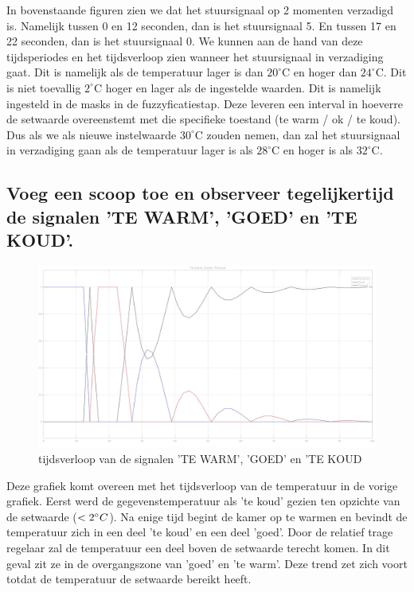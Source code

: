 \documentclass[a4paper, 12pt]{article}
\begin{document}
In bovenstaande figuren zien we dat het stuursignaal op 2 momenten verzadigd is. Namelijk tussen 0 en 12 seconden, dan is het stuursignaal 5. En tussen 17 en 22 seconden, dan is het stuursignaal 0. We kunnen aan de hand van deze tijdsperiodes en het tijdsverloop zien wanneer het stuursignaal in verzadiging gaat. Dit is namelijk als de temperatuur lager is dan $20^\circ$C en hoger dan $24^\circ$C. Dit is niet toevallig $2^\circ$C hoger en lager als de ingestelde waarden. Dit is namelijk ingesteld in de masks in de fuzzyficatiestap. Deze leveren een interval in hoeverre de setwaarde overeenstemt met die specifieke toestand (te warm / ok / te koud). Dus als we als nieuwe instelwaarde $30^\circ$C zouden nemen, dan zal het stuursignaal in verzadiging gaan als de temperatuur lager is als $28^\circ$C en hoger is als $32^\circ$C.

\subsection{Voeg een scoop toe en observeer tegelijkertijd de signalen 'TE WARM', 'GOED' en 'TE KOUD'.}

\begin{figure}[!h]
	\includegraphics[width=1\linewidth]{Labo4_1_signals.jpg}
	\caption{tijdsverloop van de signalen 'TE WARM', 'GOED' en 'TE KOUD}
\end{figure}
\noindent Deze grafiek komt overeen met het tijdsverloop van de temperatuur in de vorige grafiek. Eerst werd de gegevenstemperatuur als 'te koud' gezien ten opzichte van de setwaarde ($<2 \degree C$). Na enige tijd begint de kamer op te warmen en bevindt de temperatuur zich in een deel 'te koud' en een deel 'goed'. Door de relatief trage regelaar zal de temperatuur een deel boven de setwaarde terecht komen. In dit geval zit ze in de overgangszone van 'goed' en 'te warm'. Deze trend zet zich voort totdat de temperatuur de setwaarde bereikt heeft. 
\newpage
\end{document}

